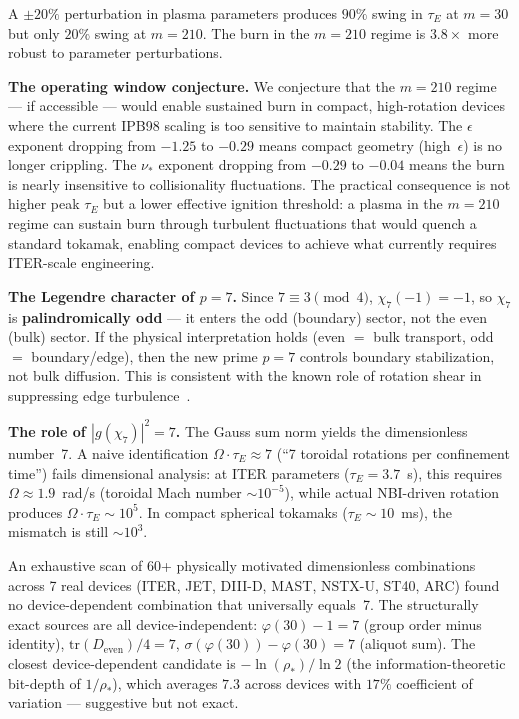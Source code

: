\documentclass[11pt,letterpaper]{article}
\theoremstyle{definition}
\begin{document}
A $\pm 20\%$ perturbation in plasma parameters produces $90\%$ swing in $\tau_E$ at $m = 30$ but only $20\%$ swing at $m = 210$. The burn in the $m = 210$ regime is $3.8\times$ more robust to parameter perturbations.

\medskip
\textbf{The operating window conjecture.} We conjecture that the $m = 210$ regime --- if accessible --- would enable sustained burn in compact, high-rotation devices where the current IPB98 scaling is too sensitive to maintain stability. The $\epsilon$ exponent dropping from $-1.25$ to $-0.29$ means compact geometry (high~$\epsilon$) is no longer crippling. The $\nu_*$ exponent dropping from $-0.29$ to $-0.04$ means the burn is nearly insensitive to collisionality fluctuations. The practical consequence is not higher peak $\tau_E$ but a lower effective ignition threshold: a plasma in the $m = 210$ regime can sustain burn through turbulent fluctuations that would quench a standard tokamak, enabling compact devices to achieve what currently requires ITER-scale engineering.

\medskip
\textbf{The Legendre character of $p = 7$.} Since $7 \equiv 3 \pmod{4}$, $\chi_7(-1) = -1$, so $\chi_7$ is \textbf{palindromically odd} --- it enters the odd (boundary) sector, not the even (bulk) sector. If the physical interpretation holds (even $=$ bulk transport, odd $=$ boundary/edge), then the new prime $p = 7$ controls boundary stabilization, not bulk diffusion. This is consistent with the known role of rotation shear in suppressing edge turbulence~\cite{burrell1997, terry2000}.

\medskip
\textbf{The role of $|g(\chi_7)|^2 = 7$.} The Gauss sum norm yields the dimensionless number~7. A naive identification $\Omega \cdot \tau_E \approx 7$ (``7 toroidal rotations per confinement time'') fails dimensional analysis: at ITER parameters ($\tau_E = 3.7$~s), this requires $\Omega \approx 1.9$~rad/s (toroidal Mach number $\sim 10^{-5}$), while actual NBI-driven rotation produces $\Omega \cdot \tau_E \sim 10^5$. In compact spherical tokamaks ($\tau_E \sim 10$~ms), the mismatch is still $\sim 10^3$.

An exhaustive scan of 60+ physically motivated dimensionless combinations across 7 real devices (ITER, JET, DIII-D, MAST, NSTX-U, ST40, ARC) found no device-dependent combination that universally equals~7. The structurally exact sources are all device-independent: $\varphi(30) - 1 = 7$ (group order minus identity), $\text{tr}(D_{\text{even}})/4 = 7$, $\sigma(\varphi(30)) - \varphi(30) = 7$ (aliquot sum). The closest device-dependent candidate is $-\ln(\rho_*)/\ln 2$ (the information-theoretic bit-depth of $1/\rho_*$), which averages $7.3$ across devices with $17\%$ coefficient of variation --- suggestive but not exact.
\end{document}
